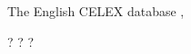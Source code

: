 
The English CELEX database \citep{CELEX},

\citet{Aronoff1976}

\citet{Harley2009}

\citet{Taft1975} ?
\citet{Taft1981} ?
\citet{Taft2004a} ?

\citet{Halle1962}
